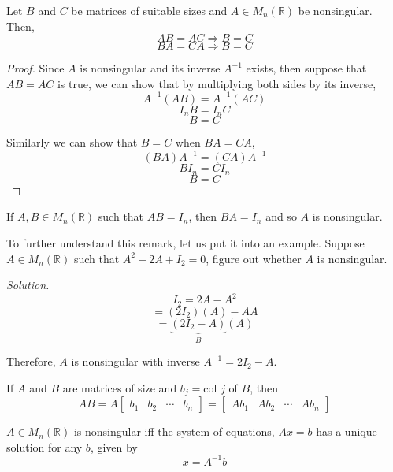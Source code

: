 \begin{theorem}
Let $B$ and $C$ be matrices of suitable sizes and $A \in M_n(\mathbb{R})$ be nonsingular. Then,
$$AB = AC \Longrightarrow B = C$$
$$BA = CA \Longrightarrow B = C$$
\end{theorem}

\begin{proof}
Since $A$ is nonsingular and its inverse $A^{-1}$ exists, then suppose that $AB = AC$ is true, we can show that by multiplying both sides by its inverse,
$$A^{-1}(AB) = A^{-1}(AC)$$
$$I_nB = I_nC$$
$$B = C$$

Similarly we can show that $B = C$ when $BA = CA$,
$$(BA)A^{-1} = (CA)A^{-1}$$
$$BI_n = CI_n$$
$$B = C$$

\end{proof}

\begin{remark}
If $A, B \in M_n(\mathbb{R})$ such that $AB = I_n$, then $BA = I_n$ and so $A$ is nonsingular.
\end{remark}

To further understand this remark, let us put it into an example. Suppose $A \in M_n(\mathbb{R})$ such that $A^2 - 2A + I_2 = 0$, figure out whether $A$ is nonsingular.

\textit{Solution.} 
$$I_2 = 2A - A^2$$
$$=(2I_2)(A)- AA$$
$$=\underbrace{(2I_2 - A)}_B(A)$$

Therefore, $A$ is nonsingular with inverse $A^{-1} = 2I_2 - A$.

\newpage
\begin{fact}
If $A$ and $B$ are matrices of  size and $b_j = \text{col }j$ of $B$, then
$$AB = A\left[\begin{matrix}
    b_1 & b_2 & \cdots & b_n
\end{matrix}\right] = \left[
\begin{matrix}
    Ab_1 & Ab_2 & \cdots & Ab_n
\end{matrix}
\right]$$
\end{fact}

\begin{theorem}
$A \in M_n(\mathbb{R})$ is nonsingular iff the system of equations, $Ax = b$ has a unique solution for any $b$, given by 
$$x = A^{-1}b$$
\end{theorem}

